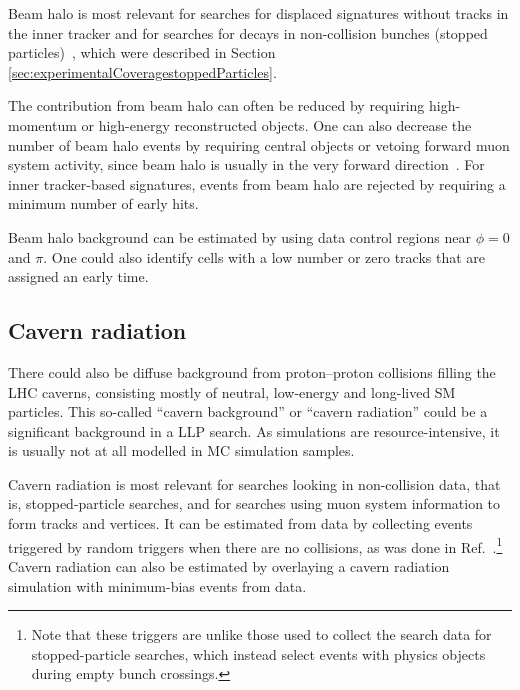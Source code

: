 Beam halo is most relevant for searches for displaced signatures without tracks in the inner tracker and for searches for decays in non-collision bunches (stopped particles)~\cite{Khachatryan:2015jha, Chatrchyan:2012dxa, Khachatryan:2010uf}, which were described in Section \ref{sec:experimentalCoveragestoppedParticles}.

The contribution from beam halo can often be reduced by requiring high-momentum or high-energy reconstructed objects. One can also decrease the number of beam halo events by requiring central objects or vetoing forward muon system activity, since beam halo is usually in the very forward direction~\cite{Khachatryan:2015jha, Chatrchyan:2012dxa, Khachatryan:2010uf}. For inner tracker-based signatures, events from beam halo are rejected by requiring a minimum number of early hits.

Beam halo background can be estimated by using data control regions near $\phi=0$ and $\pi$. One could also identify cells with a low number or zero tracks that are assigned an early time. %

\subsection{Cavern radiation} %

There could also be diffuse background from proton--proton collisions filling the LHC caverns, consisting mostly of neutral, low-energy and long-lived SM particles. This so-called ``cavern background'' or ``cavern radiation'' could be a significant background in a LLP search. As simulations are resource-intensive, it is usually not at all modelled in MC simulation samples.

Cavern radiation is most relevant for searches looking in non-collision data, that is, stopped-particle searches, and for searches using muon system information to form tracks and vertices. It can be estimated from data by collecting events triggered by random triggers when there are no collisions, as was done in Ref.~\cite{Aad:2013gva}.\footnote{Note that these triggers are unlike those used to collect the search data for stopped-particle searches, which instead select events with physics objects during empty bunch crossings.} Cavern radiation can also be estimated by overlaying a cavern radiation simulation with minimum-bias events from data.

